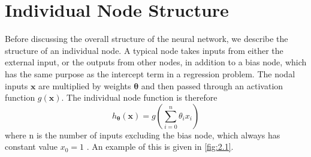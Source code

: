 \documentclass[honours,12pt]{unswthesis}
\numberwithin{equation}{section}
\theoremstyle{definition}
\begin{document}
\section{Individual Node Structure}\label{sec:2.2}
Before discussing the overall structure of the neural network, we describe the structure of an individual node. A typical node takes inputs from either the external input, or the outputs from other nodes, in addition to a bias node, which has the same purpose as the intercept term in a regression problem. The nodal inputs $\bm{x}$ are multiplied by weights $\bm{\theta}$ and then passed through an activation function $g(\bm{x})$. The individual node function is therefore \[h_{\bm{\theta}}(\bm{x})=g\left(\sum\limits^n_{i=0}\theta_ix_i\right)\] where n is the number of inputs excluding the bias node, which always has constant value $x_0=1$ \citep{neuralstat}. An example of this is given in \autoref{fig:2.1}. 
\end{document}
